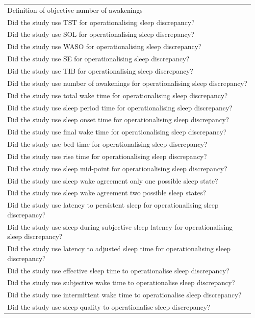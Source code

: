 \documentclass[
]{article}
\begin{document}
\begin{longtable}[t]{l}
Definition of objective number of awakenings\\
\addlinespace
Did the study use TST for operationalising sleep discrepancy?\\
Did the study use SOL for operationalising sleep discrepancy?\\
Did the study use WASO for operationalising sleep discrepancy?\\
Did the study use SE for operationalising sleep discrepancy?\\
Did the study use TIB for operationalising sleep discrepancy?\\
\addlinespace
Did the study use number of awakenings for operationalising sleep discrepancy?\\
Did the study use total wake time for operationalising sleep discrepancy?\\
Did the study use sleep period time for operationalising sleep discrepancy?\\
Did the study use sleep onset time for operationalising sleep discrepancy?\\
Did the study use final wake time for operationalising sleep discrepancy?\\
\addlinespace
Did the study use bed time for operationalising sleep discrepancy?\\
Did the study use rise time for operationalising sleep discrepancy?\\
Did the study use sleep mid-point for operationalising sleep discrepancy?\\
Did the study use sleep wake agreement only one possible sleep state?\\
Did the study use sleep wake agreement two possible sleep states?\\
\addlinespace
Did the study use latency to persistent sleep for operationalising sleep discrepancy?\\
Did the study use sleep during subjective sleep latency for operationalising sleep discrepancy?\\
Did the study use latency to adjusted sleep time for operationalising sleep discrepancy?\\
Did the study use effective sleep time to operationalise sleep discrepancy?\\
Did the study use subjective wake time to operationalise sleep discrepancy?\\
\addlinespace
Did the study use intermittent wake time to operationalise sleep discrepancy?\\
Did the study use sleep quality to operationalise sleep discrepancy?\\

\end{longtable}
\end{document}
